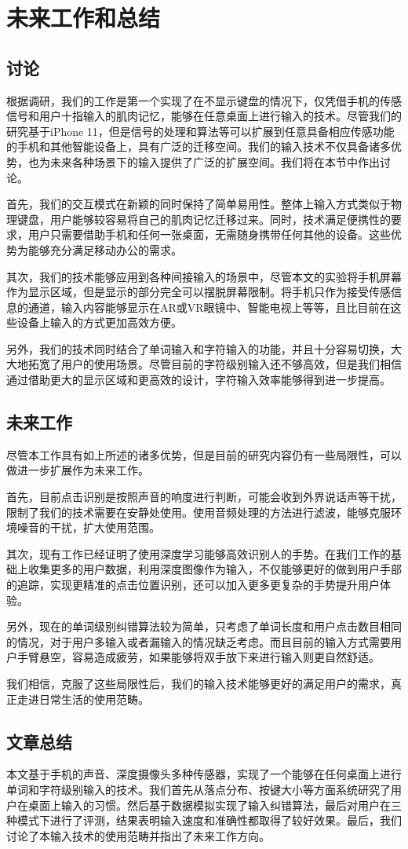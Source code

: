\chapter{未来工作和总结}
\label{cha:conclusion}
\section{讨论}
根据调研，我们的工作是第一个实现了在不显示键盘的情况下，仅凭借手机的传感信号和用户十指输入的肌肉记忆，能够在任意桌面上进行输入的技术。尽管我们的研究基于iPhone 11，但是信号的处理和算法等可以扩展到任意具备相应传感功能的手机和其他智能设备上，具有广泛的迁移空间。我们的输入技术不仅具备诸多优势，也为未来各种场景下的输入提供了广泛的扩展空间。我们将在本节中作出讨论。

首先，我们的交互模式在新颖的同时保持了简单易用性。整体上输入方式类似于物理键盘，用户能够较容易将自己的肌肉记忆迁移过来。同时，技术满足便携性的要求，用户只需要借助手机和任何一张桌面，无需随身携带任何其他的设备。这些优势为能够充分满足移动办公的需求。

其次，我们的技术能够应用到各种间接输入的场景中，尽管本文的实验将手机屏幕作为显示区域，但是显示的部分完全可以摆脱屏幕限制。将手机只作为接受传感信息的通道，输入内容能够显示在AR或VR眼镜中、智能电视上等等，且比目前在这些设备上输入的方式更加高效方便。

另外，我们的技术同时结合了单词输入和字符输入的功能，并且十分容易切换，大大地拓宽了用户的使用场景。尽管目前的字符级别输入还不够高效，但是我们相信通过借助更大的显示区域和更高效的设计，字符输入效率能够得到进一步提高。

\section{未来工作}
尽管本工作具有如上所述的诸多优势，但是目前的研究内容仍有一些局限性，可以做进一步扩展作为未来工作。

首先，目前点击识别是按照声音的响度进行判断，可能会收到外界说话声等干扰，限制了我们的技术需要在安静处使用。使用音频处理的方法进行滤波，能够克服环境噪音的干扰，扩大使用范围。

其次，现有工作已经证明了使用深度学习能够高效识别人的手势\cite{MolchanovGKK15}。在我们工作的基础上收集更多的用户数据，利用深度图像作为输入，不仅能够更好的做到用户手部的追踪，实现更精准的点击位置识别，还可以加入更多更复杂的手势提升用户体验。

另外，现在的单词级别纠错算法较为简单，只考虑了单词长度和用户点击数目相同的情况，对于用户多输入或者漏输入的情况缺乏考虑。而且目前的输入方式需要用户手臂悬空，容易造成疲劳，如果能够将双手放下来进行输入则更自然舒适。

我们相信，克服了这些局限性后，我们的输入技术能够更好的满足用户的需求，真正走进日常生活的使用范畴。

\section{文章总结}
本文基于手机的声音、深度摄像头多种传感器，实现了一个能够在任何桌面上进行单词和字符级别输入的技术。我们首先从落点分布、按键大小等方面系统研究了用户在桌面上输入的习惯。然后基于数据模拟实现了输入纠错算法，最后对用户在三种模式下进行了评测，结果表明输入速度和准确性都取得了较好效果。最后，我们讨论了本输入技术的使用范畴并指出了未来工作方向。